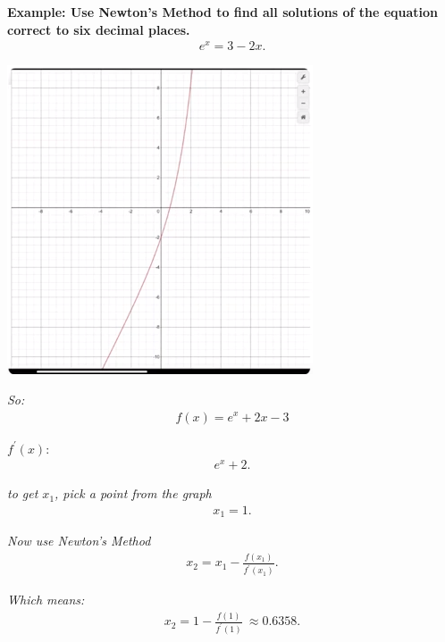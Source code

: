 \documentclass{report}
\begin{document}
  \pagebreak \bigbreak \noindent
  \begin{mdframed}
    \textbf{Example: Use Newton's Method to find all solutions of the equation correct to six decimal places.}
    \begin{align*}
      e^{x} = 3 - 2x 
    .\end{align*}
  \end{mdframed}

  \bigbreak \noindent 
  \begin{center}
    \includegraphics[scale=0.6]{ ./images/25.png }
  \end{center}
  
  \bigbreak \noindent
  \textit{So:}
  \begin{align*}
    f(x) = e^{x} +2x-3
  \end{align*}

  \bigbreak \noindent 
  \textit{$f^{\prime}(x)$}:
  \begin{align*}
    e^{x}+2
  .\end{align*}

  \bigbreak \noindent 
  \textit{to get $x_1$, pick a point from the graph}
  \begin{align*}
    x_1 = 1
  .\end{align*}

  \bigbreak \noindent 
  \textit{Now use Newton's Method}
  \begin{align*}
    x_2 = x_1 - \frac{f(x_1)}{f^{\prime}(x_1)}
  .\end{align*}

  \bigbreak \noindent 
  \textit{Which means:}
  \begin{align*}
    x_2 = 1 - \frac{f(1)}{f^{\prime}(1)} \
    \approx 0.6358
  .\end{align*}
\end{document}
